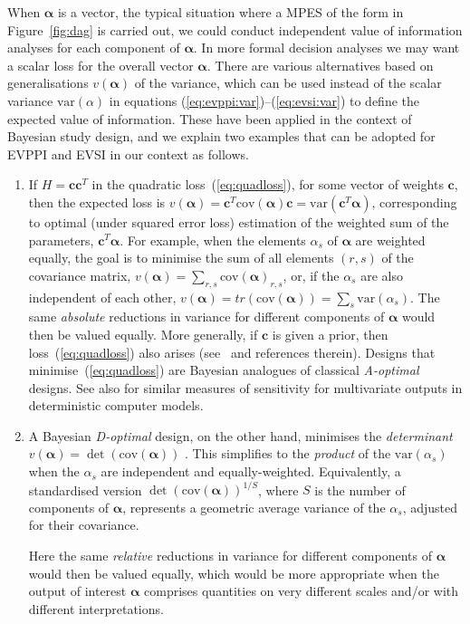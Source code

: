 \documentclass[12pt]{article}\usepackage[]{graphicx}\usepackage[]{color}
\newcommand{\cov}{\mbox{cov}}
\newcommand{\var}{\mbox{var}}
\newcommand{\cc}{\mathbf{c}}
\begin{document}
  When $\bm\alpha$ is a vector, the typical situation where a MPES of the form in Figure~\ref{fig:dag} is carried out, we could conduct independent value of information analyses for each component of $\bm\alpha$.  In more formal decision analyses we may want a scalar loss for the overall vector $\bm\alpha$.  There are various alternatives based on generalisations $v(\bm\alpha)$ of the variance, which can be used instead of the scalar variance $\var(\alpha)$ in equations (\ref{eq:evppi:var})--(\ref{eq:evsi:var}) to define the expected value of information.  These have been applied in the context of Bayesian study design, and we explain two examples that can be adopted for EVPPI and EVSI in our context as follows.

\begin{enumerate}
\item If $H=\cc \cc^T$ in the quadratic loss~(\ref{eq:quadloss}), for some vector of weights $\cc$, then the expected loss is $v(\bm\alpha) = \cc^T \cov(\bm\alpha) \cc = \var(\cc^T \bm\alpha)$, corresponding to optimal (under squared error loss) estimation of the weighted sum of the parameters, $\cc^T\bm\alpha$.   For example, when the elements $\alpha_s$ of $\bm\alpha$ are weighted equally, the goal is to minimise the sum of all elements $(r,s)$ of the covariance matrix, $v(\bm\alpha) = \sum_{r,s}\cov(\bm\alpha)_{r,s}$, or, if the $\alpha_s$ are also independent of each other, $v(\bm\alpha) = tr(\cov(\bm\alpha)) = \sum_s \var(\alpha_s)$.  The same \emph{absolute} reductions in variance for different components of $\bm\alpha$ would then be valued equally.  More generally, if $\cc$ is given a prior, then loss~(\ref{eq:quadloss}) also arises (see~\citet{chaloner1995bayesian} and references therein).  Designs that minimise~(\ref{eq:quadloss}) are Bayesian analogues of classical \emph{A-optimal} designs. See also \citet{lamboni2011multivariate} for similar measures of sensitivity for multivariate outputs in deterministic computer models.  %

\item A Bayesian \emph{D-optimal} design, on the other hand, minimises the \emph{determinant} $v(\bm\alpha) = \det(\cov(\bm\alpha))$ \citep{chaloner1995bayesian,ryan2015review}.   This simplifies to the \emph{product} of the $\var(\alpha_s)$ when the $\alpha_s$ are independent and equally-weighted.   Equivalently, a standardised version $\det(\cov(\bm\alpha))^{1/S}$, where $S$ is the number of components of $\bm\alpha$, represents a geometric average variance of the $\alpha_s$, adjusted for their covariance. 
  
Here the same \emph{relative} reductions in variance for different components of $\bm\alpha$ would then be valued equally, which would be more appropriate when the output of interest $\bm\alpha$ comprises quantities on very different scales and/or with different interpretations.

\end{enumerate}
\end{document}
